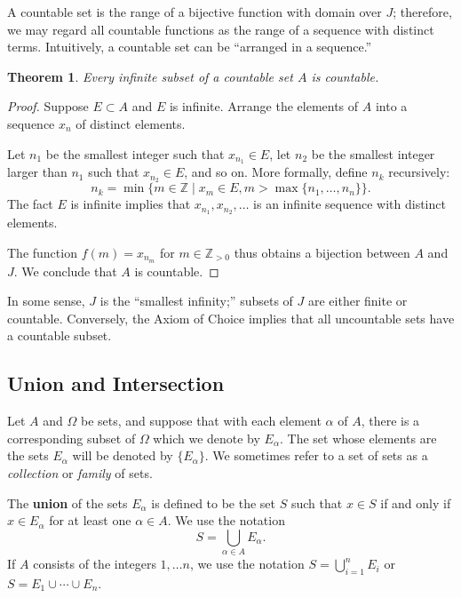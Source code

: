 \documentclass[11pt]{article}
\newtheorem{theorem}{Theorem}
\begin{document}
A countable set is the range of a bijective function with domain over $J$; therefore, we may regard all countable functions as the range of a sequence with distinct terms. Intuitively, a countable set can be ``arranged in a sequence.''

\begin{theorem}
	Every infinite subset of a countable set $A$ is countable.
\end{theorem}
\begin{adjustwidth}{1cm}{}
	\begin{proof}
		Suppose $E \subset A$ and $E$ is infinite. Arrange the elements of $A$ into a sequence ${x_{n}}$ of distinct elements.

		Let $n_{1}$ be the smallest integer such that $x_{n_{1}} \in E$, let $n_{2}$ be the smallest integer larger than $n_{1}$ such that $x_{n_{2}} \in E$, and so on. More formally, define $n_{k}$ recursively:
		\[
			n_{k} = \min \{ m \in \mathbb{Z} \mid x_{m} \in E, m > \max \{ n_{1}, \ldots, n_{n} \} \}.
		\]
		The fact $E$ is infinite implies that $x_{n_{1}}, x_{n_{2}}, \ldots$ is an infinite sequence with distinct elements.

		The function $f(m) = x_{n_{m}}$ for $m \in \mathbb{Z}_{> 0}$ thus obtains a bijection between $A$ and $J$. We conclude that $A$ is countable.
	\end{proof}
\end{adjustwidth}

In some sense, $J$ is the ``smallest infinity;'' subsets of $J$ are either finite or countable. Conversely, the Axiom of Choice implies that all uncountable sets have a countable subset. 

\newpage


\subsection{Union and Intersection}

Let $A$ and $\Omega$ be sets, and suppose that with each element $\alpha$ of $A$, there is a corresponding subset of $\Omega$ which we denote by $E_{\alpha}$. The set whose elements are the sets $E_{\alpha}$ will be denoted by $\{ E_{\alpha} \}$. We sometimes refer to a set of sets as a \textit{collection} or \textit{family} of sets.

The \textbf{union} of the sets $E_{\alpha}$ is defined to be the set $S$ such that $x \in S$ if and only if $x \in E_{\alpha}$ for at least one $\alpha \in A$. We use the notation
\[
	S = \bigcup\limits_{\alpha \in A} E_{\alpha}.
\]
If $A$ consists of the integers $1, \ldots n$, we use the notation $S = \bigcup\limits_{i = 1}^{n} E_{i}$ or $S = E_{1} \cup \cdots \cup E_{n}$.
\end{document}
